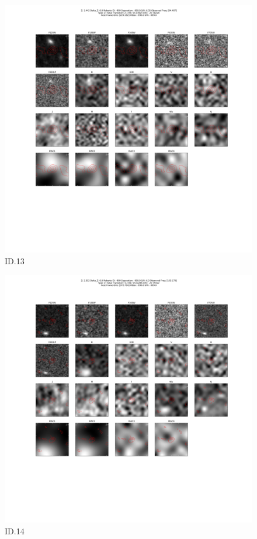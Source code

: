 \begin{figure}[tbp]
\centering \includegraphics[width=120mm]{Matched/ASPECS_Cutout_13.png}
\caption{ID.13}
\label{fig:Match_Three}
\end{figure}

\begin{figure}[tbp]
\centering \includegraphics[width=120mm]{Matched/ASPECS_Cutout_14.png}
\caption{ID.14}
\label{fig:Match_Three}
\end{figure}

